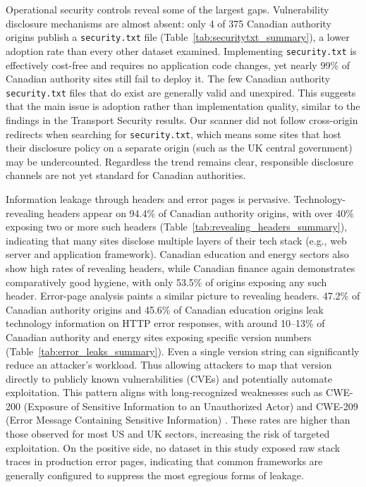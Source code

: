 \documentclass[pdflatex,sn-mathphys-num]{sn-jnl}
\numberwithin{equation}{section}
\theoremstyle{thmstyleone}
\theoremstyle{thmstyletwo}%
\theoremstyle{thmstylethree}%
\begin{document}
\vspace{1em}Operational security controls reveal some of the largest gaps. Vulnerability disclosure mechanisms 
are almost absent: only 4 of 375 Canadian authority origins publish a \texttt{security.txt} file 
(Table~\ref{tab:securitytxt_summary}), a 
lower adoption rate than every other dataset examined. Implementing \texttt{security.txt} is effectively cost-free and requires no 
application code changes, yet nearly 99\% of Canadian authority sites still fail to deploy it.
The few Canadian authority \texttt{security.txt} files that do exist are generally valid and 
unexpired. This suggests that the main issue is adoption rather than implementation quality, similar to the findings in
the Transport Security results. Our scanner did not 
follow cross-origin redirects when searching for \texttt{security.txt}, which means some sites that host their 
disclosure policy on a separate origin (such as the UK central government) may be undercounted. Regardless
the trend remains clear, responsible disclosure channels are not yet standard for Canadian 
authorities.

\vspace{1em}Information leakage through headers and error pages is pervasive. 
Technology-revealing headers appear on 94.4\% of Canadian authority origins, with over 40\% 
exposing two or more such headers (Table~\ref{tab:revealing_headers_summary}), indicating that many sites disclose multiple layers of their tech stack (e.g., web 
server and application framework). Canadian education and energy sectors also 
show high rates of revealing headers, while Canadian finance again demonstrates comparatively good hygiene, with only 53.5\% of 
origins exposing any such header. Error-page analysis paints a similar picture to revealing headers. 
47.2\% of Canadian authority origins and 45.6\% of Canadian education origins leak technology information on 
HTTP error responses, with around 10--13\% of Canadian authority and energy sites exposing specific version 
numbers (Table~\ref{tab:error_leaks_summary}). Even a single version string can significantly reduce an attacker’s 
workload. Thus allowing attackers to map that version directly to publicly known 
vulnerabilities (CVEs) and potentially automate exploitation. 
This pattern aligns with long-recognized weaknesses such as CWE-200 (Exposure of 
Sensitive Information to an Unauthorized Actor) and CWE-209 (Error Message 
Containing Sensitive Information) \cite{cwe_200, cwe_209}. These rates are higher than those observed for most US and UK sectors, 
increasing the risk of targeted exploitation. On the positive side, no dataset in this study exposed raw stack
traces in production error pages, indicating that common frameworks are generally configured to suppress the most
egregious forms of leakage.
\end{document}
